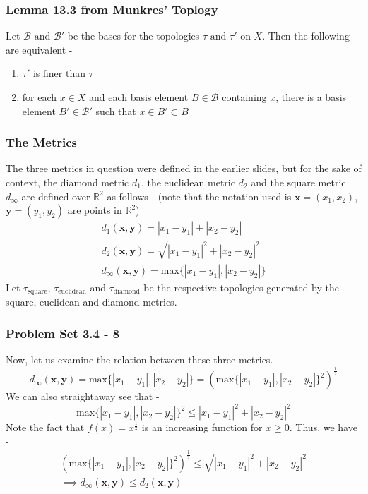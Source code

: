 \begin{frame}
    \frametitle{Lemma 13.3 from Munkres' Toplogy}
    Let $\mathcal{B} \text{ and } \mathcal{B}'$ be the bases for the topologies $\tau \text{ and } \tau'$ on $X$. Then the following are equivalent -
    \begin{enumerate}
        \item $\tau'$ is finer than $\tau$
        \item for each $x \in X$ and each basis element $B \in \mathcal{B}$ containing $x$, there is a basis element $B' \in \mathcal{B}'$ such that $x \in B' \subset B$
    \end{enumerate}
\end{frame}

\begin{frame}
    \frametitle{The Metrics}
    The three metrics in question were defined in the earlier slides, but for the sake of context, the diamond metric $d_1$, the euclidean metric $d_2$ and the square metric $d_\infty$ are defined over $\mathbb{R}^2$ as follows - (note that the notation used is $\boldsymbol{x} = (x_1, x_2)$, $\boldsymbol{y} = (y_1, y_2)$ are points in $\mathbb{R}^2$)
    \begin{gather*}
        d_1(\boldsymbol{x}, \boldsymbol{y}) = |x_1 - y_1| + |x_2 - y_2| \\
        d_2(\boldsymbol{x}, \boldsymbol{y}) = \sqrt{|x_1 - y_1|^2 + |x_2 - y_2|^2} \\
        d_\infty(\boldsymbol{x}, \boldsymbol{y}) = \text{max} \{|x_1 - y_1|, |x_2 - y_2|\}
    \end{gather*}
    Let $\tau_{\text{square}}$, $\tau_{\text{euclidean}}$ and $\tau_{\text{diamond}}$ be the respective topologies generated by the square, euclidean and diamond metrics.
\end{frame}

\begin{frame}
    \frametitle{Problem Set 3.4 - 8}
    Now, let us examine the relation between these three metrics.
    \begin{equation*}
        d_\infty(\boldsymbol{x}, \boldsymbol{y}) = \text{max} \{|x_1 - y_1|, |x_2 - y_2|\} = \left(\text{max} \{|x_1 - y_1|, |x_2 - y_2|\}^2 \right)^{\frac{1}{2}}
    \end{equation*}
    \pause
    We can also straightaway see that -
    \begin{equation*}
        \text{max} \{|x_1 - y_1|, |x_2 - y_2|\}^2 \leq |x_1 - y_1|^2 + |x_2 - y_2|^2
    \end{equation*}
    \pause
    Note the fact that $f(x) = x^{\frac{1}{2}}$ is an increasing function for $x \geq 0$. Thus, we have -
    \begin{gather*}
        \left(\text{max} \{|x_1 - y_1|, |x_2 - y_2|\}^2 \right)^{\frac{1}{2}} \leq \sqrt{|x_1 - y_1|^2 + |x_2 - y_2|^2} \\
        \implies d_\infty(\boldsymbol{x}, \boldsymbol{y}) \leq d_2(\boldsymbol{x}, \boldsymbol{y})
    \end{gather*} 
\end{frame}


